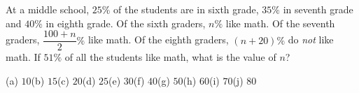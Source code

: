 At a middle school, $25\%$ of the students are in sixth grade, $35\%$ in seventh grade and $40\%$ in eighth grade. Of the sixth graders, $n\%$ like math. Of the seventh graders, $\dfrac{100+n}{2}\%$ like math. Of the eighth graders, $(n+20)\%$ do \emph{not} like math. If $51\%$ of all the students like math, what is the value of $n$?

(a) $10$\quad (b) $15$\quad (c) $20$\quad (d) $25$\quad (e) $30$\quad (f) $40$\quad (g) $50$\quad (h) $60$\quad (i) $70$\quad (j) $80$
